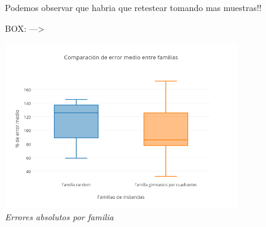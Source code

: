 Podemos observar que habria que retestear tomando mas muestras!!

BOX: --->

\vspace*{0.3cm} \vspace*{0.3cm}
  \begin{center}
 \includegraphics[width=0.75\textwidth]{./EJ2/box2.png}
\\{\textit{Errores absolutos por familia}}
\end{center}
